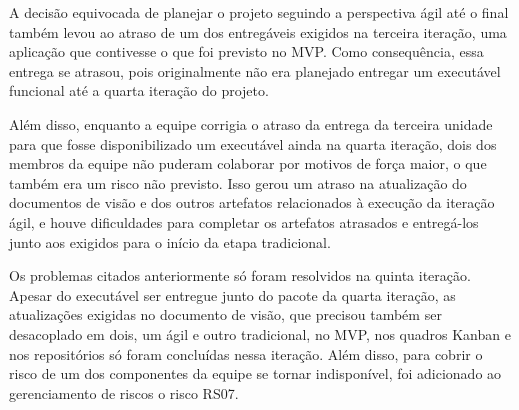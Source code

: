 \documentclass[
	12pt,				%
	oneside,			%
	a4paper,			%
	english,			%
	brazil,				%
	]{abntex2}
\begin{document}
A decisão equivocada de planejar o projeto seguindo a perspectiva ágil até o final também levou ao atraso de um dos entregáveis exigidos na terceira iteração, uma aplicação que contivesse o que foi previsto no MVP. Como consequência, essa entrega se atrasou, pois originalmente não era planejado entregar um executável funcional até a quarta iteração do projeto.

Além disso, enquanto a equipe corrigia o atraso da entrega da terceira unidade para que fosse disponibilizado um executável ainda na quarta iteração, dois dos membros da equipe não puderam colaborar por motivos de força maior, o que também era um risco não previsto. Isso gerou um atraso na atualização do documentos de visão e dos outros artefatos relacionados à execução da iteração ágil, e houve dificuldades para completar os artefatos atrasados e entregá-los junto aos exigidos para o início da etapa tradicional.

Os problemas citados anteriormente só foram resolvidos na quinta iteração. Apesar do executável ser entregue junto do pacote da quarta iteração, as atualizações exigidas no documento de visão, que precisou também ser desacoplado em dois, um ágil e outro tradicional, no MVP, nos quadros Kanban e nos repositórios só foram concluídas nessa iteração. Além disso, para cobrir o risco de um dos componentes da equipe se tornar indisponível, foi adicionado ao gerenciamento de riscos o risco RS07.



\end{document}
